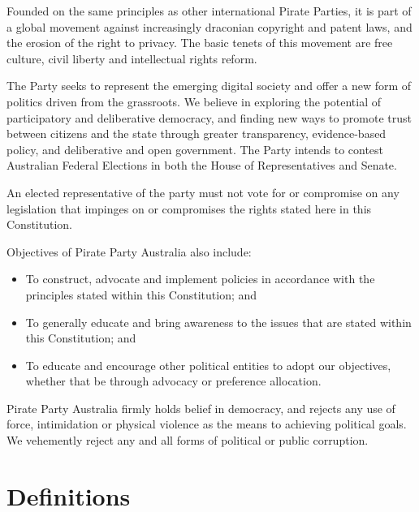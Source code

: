\documentclass[a4paper,titlepage,8.5pt]{article}
\begin{document}
Founded on the same principles as other international Pirate Parties, it is part of a global movement against increasingly draconian copyright and patent laws, and the erosion of the right to privacy. The basic tenets of this movement are free culture, civil liberty and intellectual rights reform.

The Party seeks to represent the emerging digital society and offer a new form of politics driven from the grassroots. We believe in exploring the potential of participatory and deliberative democracy, and finding new ways to promote trust between citizens and the state through greater transparency, evidence-based policy, and deliberative and open government. The Party intends to contest Australian Federal Elections in both the House of Representatives and Senate.

An elected representative of the party must not vote for or compromise on any legislation that impinges on or compromises the rights stated here in this Constitution.


Objectives of Pirate Party Australia also include:
\begin{itemize}
\item To construct, advocate and implement policies in accordance with the principles stated within this Constitution; and
\item To generally educate and bring awareness to the issues that are stated within this Constitution; and
\item To educate and encourage other political entities to adopt our objectives, whether that be through advocacy or preference allocation.
\end{itemize}


Pirate Party Australia firmly holds belief in democracy, and rejects any use of force, intimidation or physical violence as the means to achieving political goals. We vehemently reject any and all forms of political or public corruption.
\newpage

\part{Definitions}
\end{document}
